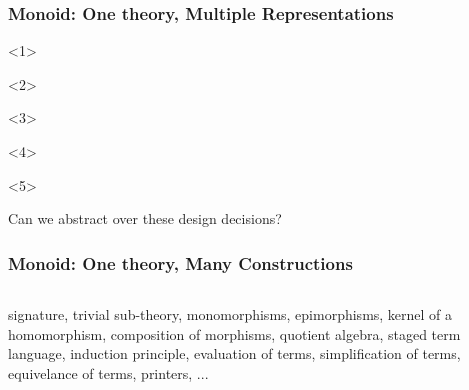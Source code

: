 \documentclass[t,10pt,numbers,fleqn,usenames,xcolor=dvipsnames]{beamer}
\begin{document}
\begin{frame}[fragile]
\frametitle{Monoid: One theory, Multiple Representations} 
\begin{onlyenv}<1>
\begin{figure}
  \scalebox{.95}{}
\end{figure}
\end{onlyenv}
\begin{onlyenv}<2>
\begin{figure}
  \scalebox{.95}{}
\end{figure}
\end{onlyenv}
\begin{onlyenv}<3>
\begin{figure}
  \scalebox{.95}{}
\end{figure}
\end{onlyenv}
\begin{onlyenv}<4>
\begin{figure}
  \scalebox{.95}{}
\end{figure}
\end{onlyenv}
\begin{onlyenv}<5>
\begin{figure}
  \scalebox{.95}{}
\end{figure}
\pause
Can we abstract over these design decisions? 
\end{onlyenv}
\end{frame}

\begin{frame}[fragile] 
\frametitle{Monoid: One theory, Many Constructions} 
\begin{columns}
    \begin{column}{0.45\textwidth}
 
     \end{column}
     \begin{column}{0.45\textwidth} 
 
     \end{column}  
\end{columns}
\vspace{0.3cm}      
\scriptsize
signature, trivial sub-theory, monomorphisms, epimorphisms, kernel of a homomorphism, composition of morphisms, quotient algebra, staged term language, induction principle, evaluation of terms, simplification of terms, equivelance of terms, printers, ... 
\end{frame}
\end{document}
